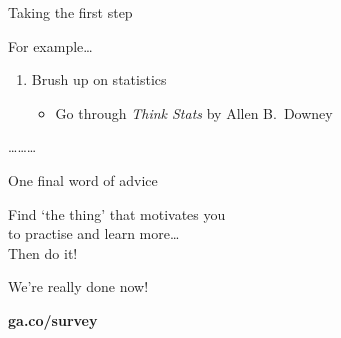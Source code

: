 \begin{frame}{Taking the first step}
{\begin{block}{For example\ldots}
\begin{enumerate}
\begin{itemize}
                      \end{itemize}
                \item Brush up on statistics
                      \begin{itemize}
                          \item Go through \textit{Think Stats} by Allen B.\
                                Downey
                      \end{itemize}
            \end{enumerate}
            \vspace{-1.5em}
            \begin{center}
                \ldots\hspace{3em}\ldots\hspace{3em}\ldots
            \end{center}
        \end{block}}
\end{frame}

\begin{frame}{One final word of advice}
    \begin{center}
        {\large%
         Find `the thing' that motivates \alert{you} \\
         to practise and learn more\ldots} \\[2\bigskipamount]
        {\LARGE%
         Then \alert{do it}!}
    \end{center}
\end{frame}

\begin{frame}
    \begin{center}
        \large%
        We're really done now!
    \end{center}
    \begin{center}
        \LARGE\bf
        ga.co/survey
    \end{center}
\end{frame}



